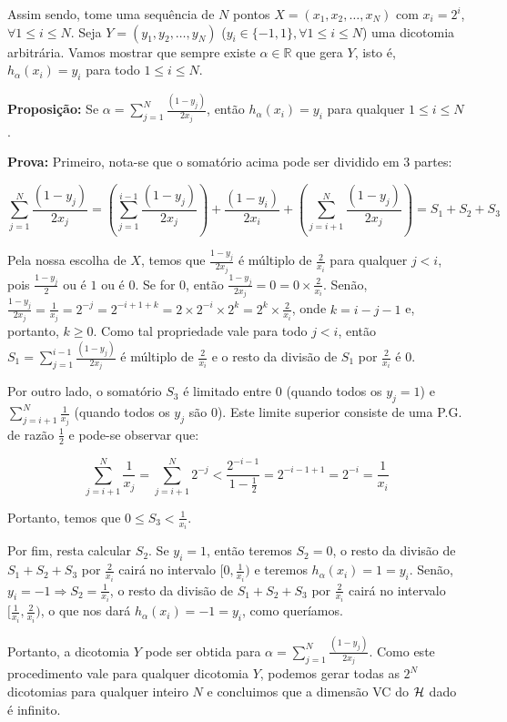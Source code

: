     Assim sendo, tome uma sequência de $N$ pontos $X = (x_1, x_2, \ldots, x_N)$ com $x_i = 2^i$, $\forall 1 \leq i \leq N$. Seja
    $Y = (y_1, y_2, \ldots, y_N)$ ($y_i \in \{-1, 1\}, \forall 1 \leq i \leq N$) uma dicotomia arbitrária. Vamos mostrar que sempre existe $\alpha \in \mathbb{R}$
    que gera $Y$, isto é, $h_{\alpha}(x_i) = y_i$ para todo $1 \leq i \leq N$.
    
    \textbf{Proposição: } Se $\alpha = \sum\limits_{j = 1}^N \frac{(1-y_j)}{2x_j}$, então $h_{\alpha}(x_i) = y_i$ para qualquer $1 \leq i \leq N$.
    
    \textbf{Prova: } Primeiro, nota-se que o somatório acima pode ser dividido em 3 partes: 
    
    \[
     \sum\limits_{j = 1}^N \frac{(1-y_j)}{2x_j}  = (\sum\limits_{j = 1}^{i - 1} \frac{(1-y_j)}{2x_j}) + \frac{(1-y_i)}{2x_i} + (\sum\limits_{j = i + 1}^{N} \frac{(1-y_j)}{2x_j}) = S_1 + S_2 + S_3
    \]

    Pela nossa escolha de $X$, temos que $\frac{1-y_j}{2x_j}$ é múltiplo de $\frac{2}{x_i}$ para qualquer $j < i$, pois $\frac{1-y_j}{2}$ ou é $1$ ou é $0$. Se for 0,
    então $\frac{1-y_j}{2x_j} = 0 = 0 \times \frac{2}{x_i}$. Senão,
    $\frac{1-y_j}{2x_j} = \frac{1}{x_j} = 2^{-j} = 2^{-i + 1 + k} = 2 \times 2^{-i} \times 2^k = 2^k \times \frac{2}{x_i}$, onde $k = i - j - 1$ e, portanto, $k \geq 0$.
    Como tal propriedade vale para todo $j < i$, então $S_1 = \sum\limits_{j = 1}^{i - 1} \frac{(1-y_j)}{2x_j}$ é múltiplo de $\frac{2}{x_i}$ e o resto da divisão de $S_1$
    por $\frac{2}{x_i}$ é 0.
    
    Por outro lado, o somatório $S_3$ é limitado entre $0$ (quando todos os $y_j  = 1$) e $\sum\limits_{j = i + 1}^{N} \frac{1}{x_j}$ (quando todos os $y_j$ são 0). Este limite
    superior consiste de uma P.G. de razão $\frac{1}{2}$ e pode-se observar que:
    
    \[
      \sum\limits_{j = i + 1}^{N} \frac{1}{x_j} = \sum\limits_{j = i + 1}^{N} 2^{-j} < \frac{2^{-i-1}}{1 - \frac{1}{2}} = 2^{-i-1+1} = 2^{-i} = \frac{1}{x_i}
    \]

    Portanto, temos que $0 \leq S_3 < \frac{1}{x_i}$.
    
    Por fim, resta calcular $S_2$. Se $y_i = 1$, então teremos $S_2 = 0$, o resto da divisão de $S_1 + S_2 + S_3$ por $\frac{2}{x_i}$ cairá no intervalo $[0, \frac{1}{x_i})$ e
    teremos $h_\alpha(x_i) = 1 = y_i$. Senão, $y_i = -1 \Rightarrow S_2 = \frac{1}{x_i}$, o resto da divisão de
    $S_1 + S_2 + S_3$ por $\frac{2}{x_i}$ cairá no intervalo $[\frac{1}{x_i}, \frac{2}{x_i})$, o que nos dará $h_\alpha(x_i) = -1 = y_i$, como queríamos.
    
    Portanto, a dicotomia $Y$ pode ser obtida para $\alpha = \sum\limits_{j = 1}^N \frac{(1-y_j)}{2x_j}$. Como este procedimento
    vale para qualquer dicotomia $Y$, podemos gerar todas as $2^N$ dicotomias para qualquer inteiro $N$ e concluimos que a dimensão VC do $\mathcal{H}$ dado é infinito.
